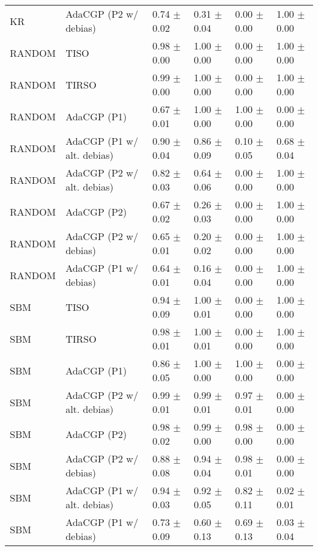 \begin{tabular}{llllll}
KR     &       AdaCGP (P2 w/ debias) &  0.74 $\pm$ 0.02 &  0.31 $\pm$ 0.04 &  0.00 $\pm$ 0.00 &  1.00 $\pm$ 0.00 \\
RANDOM &                        TISO &  0.98 $\pm$ 0.00 &  1.00 $\pm$ 0.00 &  0.00 $\pm$ 0.00 &  1.00 $\pm$ 0.00 \\
RANDOM &                       TIRSO &  0.99 $\pm$ 0.00 &  1.00 $\pm$ 0.00 &  0.00 $\pm$ 0.00 &  1.00 $\pm$ 0.00 \\
RANDOM &                 AdaCGP (P1) &  0.67 $\pm$ 0.01 &  1.00 $\pm$ 0.00 &  1.00 $\pm$ 0.00 &  0.00 $\pm$ 0.00 \\
RANDOM &  AdaCGP (P1 w/ alt. debias) &  0.90 $\pm$ 0.04 &  0.86 $\pm$ 0.09 &  0.10 $\pm$ 0.05 &  0.68 $\pm$ 0.04 \\
RANDOM &  AdaCGP (P2 w/ alt. debias) &  0.82 $\pm$ 0.03 &  0.64 $\pm$ 0.06 &  0.00 $\pm$ 0.00 &  1.00 $\pm$ 0.00 \\
RANDOM &                 AdaCGP (P2) &  0.67 $\pm$ 0.02 &  0.26 $\pm$ 0.03 &  0.00 $\pm$ 0.00 &  1.00 $\pm$ 0.00 \\
RANDOM &       AdaCGP (P2 w/ debias) &  0.65 $\pm$ 0.01 &  0.20 $\pm$ 0.02 &  0.00 $\pm$ 0.00 &  1.00 $\pm$ 0.00 \\
RANDOM &       AdaCGP (P1 w/ debias) &  0.64 $\pm$ 0.01 &  0.16 $\pm$ 0.04 &  0.00 $\pm$ 0.00 &  1.00 $\pm$ 0.00 \\
SBM    &                        TISO &  0.94 $\pm$ 0.09 &  1.00 $\pm$ 0.01 &  0.00 $\pm$ 0.00 &  1.00 $\pm$ 0.00 \\
SBM    &                       TIRSO &  0.98 $\pm$ 0.01 &  1.00 $\pm$ 0.01 &  0.00 $\pm$ 0.00 &  1.00 $\pm$ 0.00 \\
SBM    &                 AdaCGP (P1) &  0.86 $\pm$ 0.05 &  1.00 $\pm$ 0.00 &  1.00 $\pm$ 0.00 &  0.00 $\pm$ 0.00 \\
SBM    &  AdaCGP (P2 w/ alt. debias) &  0.99 $\pm$ 0.01 &  0.99 $\pm$ 0.01 &  0.97 $\pm$ 0.01 &  0.00 $\pm$ 0.00 \\
SBM    &                 AdaCGP (P2) &  0.98 $\pm$ 0.02 &  0.99 $\pm$ 0.00 &  0.98 $\pm$ 0.00 &  0.00 $\pm$ 0.00 \\
SBM    &       AdaCGP (P2 w/ debias) &  0.88 $\pm$ 0.08 &  0.94 $\pm$ 0.04 &  0.98 $\pm$ 0.01 &  0.00 $\pm$ 0.00 \\
SBM    &  AdaCGP (P1 w/ alt. debias) &  0.94 $\pm$ 0.03 &  0.92 $\pm$ 0.05 &  0.82 $\pm$ 0.11 &  0.02 $\pm$ 0.01 \\
SBM    &       AdaCGP (P1 w/ debias) &  0.73 $\pm$ 0.09 &  0.60 $\pm$ 0.13 &  0.69 $\pm$ 0.13 &  0.03 $\pm$ 0.04 \\
\bottomrule
\end{tabular}
